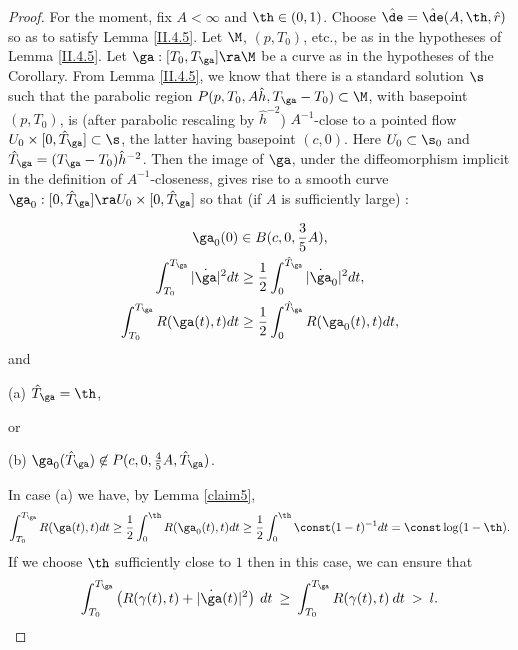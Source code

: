\begin{proof}
For the moment, fix $A<\infty$ and $\th\in (0,1)$.
Choose $\hat\de=\hat\de(A,\th,\hat r)$
so as to satisfy
Lemma \ref{II.4.5}.   Let $\M$, $(p,T_0)$, etc.,
be as in the hypotheses of Lemma \ref{II.4.5}. Let $\ga:[T_0,T_\ga]\ra\M$
be a curve as in the hypotheses of the Corollary.
From Lemma \ref{II.4.5}, we know that there is a standard solution
$\s$ such that  the parabolic region
$P(p,T_0,A\hat h,T_\ga-T_0) \subset \M$, with basepoint $(p,T_0)$, is
(after parabolic rescaling by $\hat h^{-2}$) $A^{-1}$-close
to a  pointed flow $U_0\times [0,\hat T_\ga] \subset \s$, the latter
having basepoint $(c,0)$. Here
$U_0\subset \s_0$ and $\hat T_\ga= (T_\ga-T_0)\hat h^{-2}$.
Then the image of $\ga$, under the diffeomorphism implicit in the definition
of $A^{-1}$-closeness, gives rise to a smooth curve
$\ga_0:[0,\hat T_\ga]\ra U_0\times [0,\hat T_\ga]$ so that
(if $A$ is sufficiently large) :

\begin{gather}
\ga_0(0)\in B(c,0,\frac35 A),\\
\int_{T_0}^{T_\ga}|\dot{\ga}|^2dt
\geq \frac12 \int_0^{\hat T_\ga}|\dot{\ga}_0|^2dt,\\
\int_{T_0}^{T_\ga}R({\ga}(t),t)dt
\geq \frac12 \int_0^{\hat T_\ga}R({\ga}_0(t),t)dt,
\end{gather}
and

(a) $\hat T_\ga=\th$,

or

(b) $\ga_0(\hat T_\ga)\not\in P(c,0,\frac45 A,\hat T_\ga)$.

\noindent
In case (a) we have, by Lemma \ref{claim5},
\begin{equation}
\int_{T_0}^{T_\ga} R(\ga(t), t)dt\geq
\frac12 \int_0^\th R(\ga_0(t),t)dt
\geq \frac12\int_0^\th \const(1-t)^{-1}dt=\const \log(1-\th).
\end{equation}
If we choose $\th$ sufficiently close to $1$ then in this case,
we can ensure that
\begin{equation}
\int_{T_0}^{T_\ga} \left( R(\gamma(t), t)+|\dot{\ga}(t)|^2 \right) \: dt
\: \ge \:
\int_{T_0}^{T_\ga} R(\gamma(t), t) \: dt \: > \: l.
\end{equation}


\end{proof}
